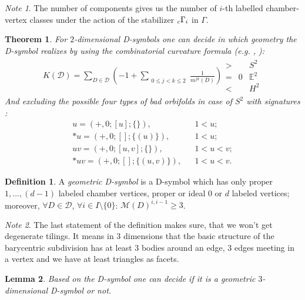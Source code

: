 \documentclass[12pt,a4paper]{article}
\numberwithin{equation}{section}
\newcommand{\leftsub}[2]{{\vphantom{#2}}_{#1}{#2}}
\theoremstyle{plain}%
\newtheorem{thm}{Theorem}[section]
\newtheorem{lem}[thm]{Lemma}
\theoremstyle{definition}
\newtheorem{defn}{Definition}[section]
\theoremstyle{remark}
\newtheorem*{note}{Note}
\begin{document}
\begin{note}
  The number of components gives us the number of $i$-th labelled chamber-vertex
  classes under the action of the stabilizer $\leftsub{c}{\Gamma}_i$ in $\Gamma$.
\end{note}

\begin{thm}
  \label{thm:curvature}
  For $2$-dimensional D-symbols one can decide in which geometry the
  D-symbol realizes by using the {\em combinatorial curvature formula}
  (e.g. \cite{M96}, \cite{LMS94}):
  \begin{align*}
    K(\mathcal{D})=\sum_{D\in
    \mathcal{D}}\left(-1+\sum_{\substack{0\le j<k\le 2}}\frac{1}{m^{jk}(D)}\right)
    \begin{array}{cccc}
      > & & S^2 \\
      = & 0 & \mathbb{E}^2 \\
      < & & H^2
    \end{array}
  \end{align*}
  And excluding the possible four types of bad orbifolds in case of $S^2$ with 
  signatures \cite{Ma67}:
  \begin{align*}
    u=(+,0;[u];\{\}), & & 1<u;\\
    *u=(+,0;[];\{(u)\}), & & 1<u;\\
    uv=(+,0;[u,v];\{\}), & & 1<u<v;\\
    *uv=(+,0;[];\{(u,v)\}), & & 1<u<v.
  \end{align*}
\end{thm}

\begin{defn}
  \label{def:D-sym}
  A {\em geometric D-symbol} is a D-symbol which
  has only proper $1,\ldots,(d-1)$ labeled chamber vertices, proper or ideal $0$ or
  $d$ labeled vertices; moreover, $\forall D\in \mathcal{D}$, $\forall i\in
  I\setminus\{0\}$: $\mathcal{M}(D)^{i,i-1}\geq3$.
\end{defn}

\begin{note}
  The last statement of the definition makes sure, that we won't get degenerate
  tilings. It means in $3$ dimensions that the basic structure of the barycentric
  subdivision has at least 3 bodies around an edge, 3 edges meeting in a
  vertex and we have at least triangles as facets.
\end{note}

\begin{lem}
  Based on the D-symbol one can decide if it is a geometric $3$-dimensional
  D-symbol or not.
\end{lem}
\end{document}

